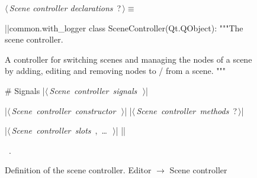 \documentclass[%
    a4paper,    %
    justified,  %
    nobib,      %
    openany     %
]{tufte-book}
\begin{document}
\begin{figure}
\begin{flushleft} \small
\begin{minipage}{\linewidth}\label{scrap87}\raggedright\small
{} $\langle\,${\itshape Scene controller declarations}\nobreak\ {\footnotesize {?}}$\,\rangle\equiv$
\vspace{-1ex}
\begin{pythoncode}
|\normalfont{}\fontfamily{}|common.with_logger
class SceneController(Qt.QObject):
    """The scene controller.

    A controller for switching scenes and managing the nodes of a scene by
    adding, editing and removing nodes to / from a scene.
    """

    # Signals
    |\hbox{$\langle\,${\itshape Scene controller signals}\nobreak\ {\footnotesize {}}$\,\rangle$}|

    |\hbox{$\langle\,${\itshape Scene controller constructor}\nobreak\ {\footnotesize {}}$\,\rangle$}|
    |\hbox{$\langle\,${\itshape Scene controller methods}\nobreak\ {\footnotesize ?}$\,\rangle$}|

    |\hbox{$\langle\,${\itshape Scene controller slots}\nobreak\ {\footnotesize {}, \ldots\ }$\,\rangle$}|
|\NWsep|
\end{pythoncode}
\vspace{1.5ex}
\footnotesize
\begin{list}{}{\setlength{\itemsep}{-\parsep}\setlength{\itemindent}{-\leftmargin}}
\item \NWtxtMacroRefIn\ .

\item{}
\end{list}
\end{minipage}\vspace{4ex}
\end{flushleft}
\caption{Definition of the scene controller.
  \newline{}\newline{}Editor $\rightarrow$ Scene controller}
\label{editor:lst:scene-controller}
\end{figure}
\end{document}
